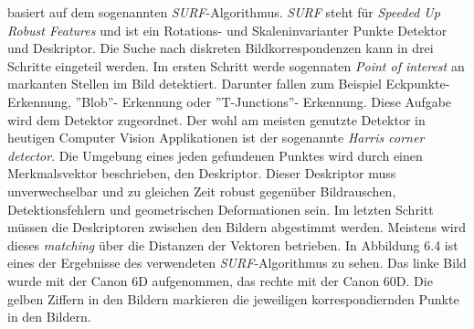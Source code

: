 basiert auf dem sogenannten \textit{SURF}-Algorithmus. \textit{SURF} steht für \textit{Speeded Up Robust Features} und ist ein Rotations- und Skaleninvarianter Punkte Detektor und Deskriptor\cite{SURF}. Die Suche nach diskreten Bildkorrespondenzen kann in drei Schritte eingeteil werden. Im ersten Schritt werde sogennaten \textit{Point of interest} an markanten Stellen im Bild detektiert. Darunter fallen zum Beispiel Eckpunkte-Erkennung, ''Blob''- Erkennung oder  ''T-Junctions''- Erkennung\cite{SURF}. Diese Aufgabe wird dem Detektor zugeordnet. Der wohl am meisten genutzte Detektor in heutigen Computer Vision Applikationen ist der sogenannte \textit{Harris corner detector}\cite{SURF}. Die Umgebung eines jeden gefundenen Punktes wird durch einen Merkmalsvektor beschrieben, den Deskriptor\cite{SURF}. Dieser Deskriptor muss unverwechselbar und zu gleichen Zeit robust  gegenüber Bildrauschen, Detektionsfehlern und geometrischen Deformationen sein. Im letzten Schritt müssen die Deskriptoren zwischen den Bildern abgestimmt werden. Meistens wird dieses \textit{matching} über die Distanzen der Vektoren betrieben. In Abbildung 6.4 ist eines der Ergebnisse des verwendeten \textit{SURF}-Algorithmus zu sehen. Das linke Bild wurde mit der Canon 6D aufgenommen, das rechte mit der Canon 60D. Die gelben Ziffern in den Bildern markieren die jeweiligen korrespondiernden Punkte in den Bildern.\\

